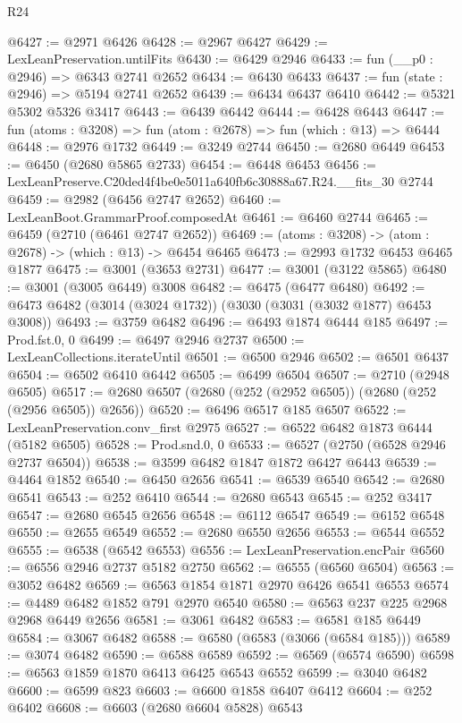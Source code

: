 \begin{lexlean}{R24}
\begin{coremodule}
@6427 := @2971 @6426
@6428 := @2967 @6427
@6429 := LexLeanPreservation.untilFits
@6430 := @6429 @2946
@6433 := fun (__p0 : @2946) => @6343 @2741 @2652
@6434 := @6430 @6433
@6437 := fun (state : @2946) => @5194 @2741 @2652
@6439 := @6434 @6437 @6410
@6442 := @5321 @5302 @5326 @3417
@6443 := @6439 @6442
@6444 := @6428 @6443
@6447 := fun (atoms : @3208) => fun (atom : @2678) => fun (which : @13) => @6444
@6448 := @2976 @1732
@6449 := @3249 @2744
@6450 := @2680 @6449
@6453 := @6450 (@2680 @5865 @2733)
@6454 := @6448 @6453
@6456 := LexLeanPreserve.C20ded4f4be0e5011a640fb6c30888a67.R24.__fits_30 @2744
@6459 := @2982 (@6456 @2747 @2652)
@6460 := LexLeanBoot.GrammarProof.composedAt
@6461 := @6460 @2744
@6465 := @6459 (@2710 (@6461 @2747 @2652))
@6469 := (atoms : @3208) -> (atom : @2678) -> (which : @13) -> @6454 @6465
@6473 := @2993 @1732 @6453 @6465 @1877
@6475 := @3001 (@3653 @2731)
@6477 := @3001 (@3122 @5865)
@6480 := @3001 (@3005 @6449) @3008
@6482 := @6475 (@6477 @6480)
@6492 := @6473 @6482 (@3014 (@3024 @1732)) (@3030 (@3031 (@3032 @1877) @6453 @3008))
@6493 := @3759 @6482
@6496 := @6493 @1874 @6444 @185
@6497 := Prod.fst.{0, 0}
@6499 := @6497 @2946 @2737
@6500 := LexLeanCollections.iterateUntil
@6501 := @6500 @2946
@6502 := @6501 @6437
@6504 := @6502 @6410 @6442
@6505 := @6499 @6504
@6507 := @2710 (@2948 @6505)
@6517 := @2680 @6507 (@2680 (@252 (@2952 @6505)) (@2680 (@252 (@2956 @6505)) @2656))
@6520 := @6496 @6517 @185 @6507
@6522 := LexLeanPreservation.conv_first @2975
@6527 := @6522 @6482 @1873 @6444 (@5182 @6505)
@6528 := Prod.snd.{0, 0}
@6533 := @6527 (@2750 (@6528 @2946 @2737 @6504))
@6538 := @3599 @6482 @1847 @1872 @6427 @6443
@6539 := @4464 @1852
@6540 := @6450 @2656
@6541 := @6539 @6540
@6542 := @2680 @6541
@6543 := @252 @6410
@6544 := @2680 @6543
@6545 := @252 @3417
@6547 := @2680 @6545 @2656
@6548 := @6112 @6547
@6549 := @6152 @6548
@6550 := @2655 @6549
@6552 := @2680 @6550 @2656
@6553 := @6544 @6552
@6555 := @6538 (@6542 @6553)
@6556 := LexLeanPreservation.encPair
@6560 := @6556 @2946 @2737 @5182 @2750
@6562 := @6555 (@6560 @6504)
@6563 := @3052 @6482
@6569 := @6563 @1854 @1871 @2970 @6426 @6541 @6553
@6574 := @4489 @6482 @1852 @791 @2970 @6540
@6580 := @6563 @237 @225 @2968 @2968 @6449 @2656
@6581 := @3061 @6482
@6583 := @6581 @185 @6449
@6584 := @3067 @6482
@6588 := @6580 (@6583 (@3066 (@6584 @185)))
@6589 := @3074 @6482
@6590 := @6588 @6589
@6592 := @6569 (@6574 @6590)
@6598 := @6563 @1859 @1870 @6413 @6425 @6543 @6552
@6599 := @3040 @6482
@6600 := @6599 @823
@6603 := @6600 @1858 @6407 @6412
@6604 := @252 @6402
@6608 := @6603 (@2680 @6604 @5828) @6543

\end{coremodule}
\end{lexlean}
